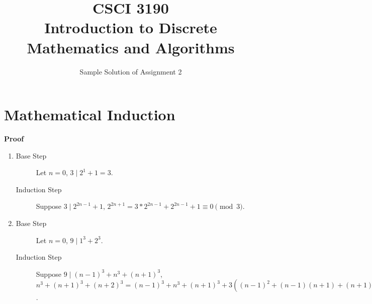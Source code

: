 \documentclass{../../cls/sig-alternate-05-2015}
\begin{document}






%

\title{CSCI 3190 \\ Introduction to Discrete Mathematics and Algorithms}
\subtitle{Sample Solution of Assignment 2}

\maketitle
\begin{abstract}

\end{abstract}

\keywords{}

\section{Mathematical Induction}
\textbf{Proof}\begin{enumerate}[label=(\alph*)]
	\item \begin{description}
		\item[Base Step] Let $n = 0$, $3 \mid 2^1 + 1 = 3$.
		\item[Induction Step] Suppose $3 \mid 2^{2n - 1} + 1$, $2^{2n + 1} = 3 * 2^{2n - 1} + 2^{2n - 1} + 1 \equiv 0 \pmod{3}$.
	\end{description}
	\item \begin{description}
		\item[Base Step] Let $n = 0$, $9 \mid 1^3 + 2^3$.
		\item[Induction Step] Suppose $9 \mid (n - 1)^3 + n^3 + (n + 1)^3$, $n^3 + (n + 1)^3 + (n + 2)^3 = (n - 1)^3 + n^3 + (n + 1)^3 + 3((n - 1)^2 + (n - 1)(n + 1) + (n + 1)^2) \equiv 0 \pmod{3}$.
	\end{description}
\end{enumerate}
\end{document}
